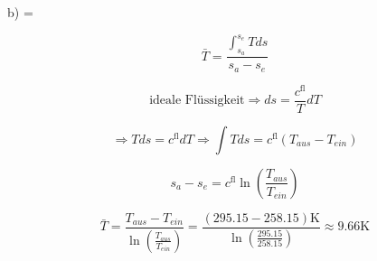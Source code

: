 b) \quad {} = 

\[
\bar{T} = \frac{\int_{s_{a}}^{s_{e}} T ds}{s_{a} - s_{e}}
\]

\[
\text{ideale Flüssigkeit} \Rightarrow ds = \frac{c^{\text{fl}}}{T} dT
\]

\[
\Rightarrow T ds = c^{\text{fl}} dT \Rightarrow \int T ds = c^{\text{fl}} (T_{aus} - T_{ein})
\]

\[
s_{a} - s_{e} = c^{\text{fl}} \ln \left( \frac{T_{aus}}{T_{ein}} \right)
\]

\[
\bar{T} = \frac{T_{aus} - T_{ein}}{\ln \left( \frac{T_{aus}}{T_{ein}} \right)} = \frac{(295.15 - 258.15) \text{K}}{\ln \left( \frac{295.15}{258.15} \right)} \approx 9.66 \text{K}
\]